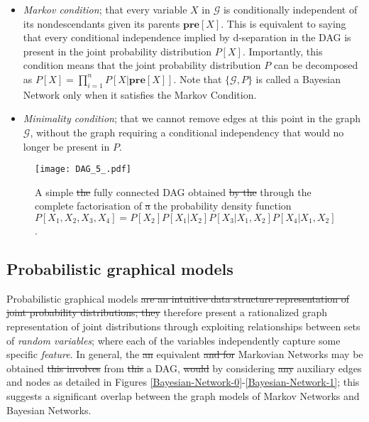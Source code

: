 \documentclass[7pt]{article}
\begin{document}
\begin{itemize}
	\item \emph{Markov condition}; that every variable $X$ in $\mathcal{G}$ is conditionally independent of its nondescendants given its parents $\mathbf{pre} [ X]$. This is equivalent to saying that every conditional independence implied by d-separation in the DAG is present in the joint probability distribution $P[X]$. Importantly, this condition means that the joint probability distribution $P$ can be decomposed as $P[X]  = \prod_{i=1}^{n} P [ X | \mathbf{pre} [ X] ]$. Note that $\{\mathcal{G}, P\}$ is called a Bayesian Network only when it satisfies the Markov Condition. 
	\item \emph{Minimality condition}; that we cannot remove edges at this point in the graph $\mathcal{G}$, without the graph requiring a conditional independency that would  no longer be present in $P$.
\end{itemize}

\begin{figure}
	\centering
	\texttt{[image: DAG\_5\_.pdf]}
	\caption{A simple \st{the} fully connected DAG  obtained \st{by the} through the complete factorisation of \st{a} the probability density function  $P[X_1,X_2,X_3,X_4] = P[X_2]P[X_1|X_2]P[X_3|X_1,X_2]P[X_4|X_1,X_2]$.}
	\label{DAG-example}
\end{figure}

\subsection{Probabilistic graphical models}

{Probabilistic graphical models} \st{are an intuitive data structure representation of joint probability distributions; they} therefore present a rationalized graph representation of joint distributions through exploiting relationships between sets of \emph{random variables}; where each of the variables independently capture some specific \emph{feature}. In general, the \st{an} equivalent \st{and for} Markovian Networks may be obtained \st{this involves} from \st{this} a DAG, \st{would} by considering \st{any} auxiliary edges and nodes \cite{castillo2012expert,pearl1988probabilistic} as detailed in Figures \ref{Bayesian-Network-0}-\ref{Bayesian-Network-1}; this suggests a significant overlap between the graph models of Markov Networks and Bayesian Networks. 
\end{document}

